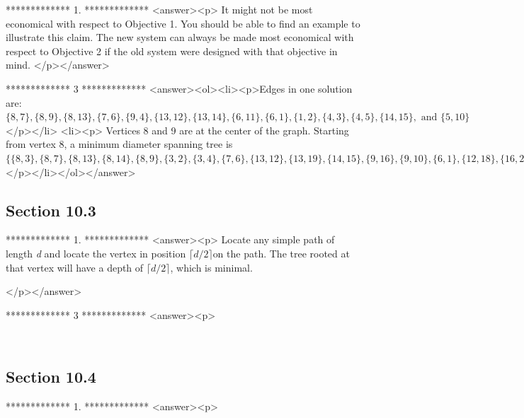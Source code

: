 *************
1.
*************
<answer><p> It might not be most economical with respect to Objective 1. You should be able to find an example to illustrate this claim. The new system can
always be made most economical with respect to Objective 2 if the old system were designed with that objective in mind.
</p></answer>


*************
3
*************
<answer><ol><li><p>Edges in one solution are: \(\{8,7\},\{8,9\},\{8,13\},\{7,6\},\{9,4\},\{13,12\},\{13,14\},\{6,11\},\{6,1\},\{1,2\},\{4,3\},\{4,5\},\{14,15\},
\textrm{ and } \{5,10\}\)</p></li>
<li><p> Vertices 8 and 9 are at the center of the graph. Starting from vertex 8, a minimum diameter spanning tree is \(\{\{8, 3\}, \{8, 7\}, \{8, 13\},
\{8, 14\}, \{8, 9\}, \{3, 2\}, \{3, 4\}, \{7, 6\}, \{13, 12\}, \{13, 19\}, \{14, 15\}, \{9, 16\}, \{9, 10\}, \{6, 1\}, \{12, 18\}, \{16, 20\}, \{16,
17\}, \{10, 11\}, \{20, 21\}, \{11, 5\}\}. \text{The} \text{diameter} \text{of} \text{the} \text{tree} \text{is} 7.\)
</p></li></ol></answer>




\subsection{Section 10.3}

*************
1.
*************
<answer><p> Locate any simple path of length \textit{ d }and locate the vertex in position \(\lceil d/2\rceil\)on the path. The tree rooted at that vertex
will have a depth of \(\lceil d/2\rceil\), which is minimal.

</p></answer>


*************
3
*************
<answer><p>

\begin{doublespace}
\noindent\(\)
\end{doublespace}








\subsection{Section 10.4}

*************
1.
*************
<answer><p>

\begin{doublespace}
\noindent\(\)
\end{doublespace}

\begin{doublespace}
\noindent\(\)
\end{doublespace}





